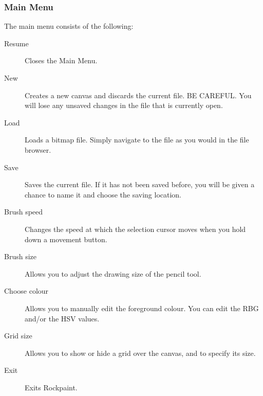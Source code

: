 \subsubsection{Main Menu}
The main menu consists of the following:
\begin{description}
    \item[Resume]
        Closes the Main Menu.
    \item[New]
        Creates a new canvas and discards the current file. BE CAREFUL.
        You will lose any unsaved changes in the file that is currently open.
    \item[Load]
        Loads a bitmap file. Simply navigate to the file as you
        would in the file browser.
    \item[Save]
        Saves the current file. If it has not been saved before,
        you will be given a chance to name it and choose the saving location.
    \item[Brush speed]
        Changes the speed at which the selection cursor
        moves when you hold down a movement button.
    \item[Brush size]
        Allows you to adjust the drawing size of the pencil tool.
    \item[Choose colour]
        Allows you to manually edit the foreground colour.
        You can edit the RBG and/or the HSV values.
    \item[Grid size]
        Allows you to show or hide a grid over the canvas,
        and to specify its size.
    \item[Exit]
        Exits Rockpaint.
\end{description}


